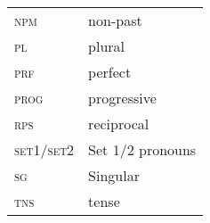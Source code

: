 \documentclass[output=paper]{langsci/langscibook}
\begin{document}
\begin{tabularx}{.45\textwidth}{>{\scshape}lX}
npm & non-past \\

pl & plural \\

prf & perfect \\

prog & progressive\\

rps & reciprocal \\

set1/set2 & Set 1/2 pronouns \\

sg & Singular \\

tns & tense \\

\end{tabularx}
 
\printbibliography[heading=subbibliography,notkeyword=this]
\end{document}
